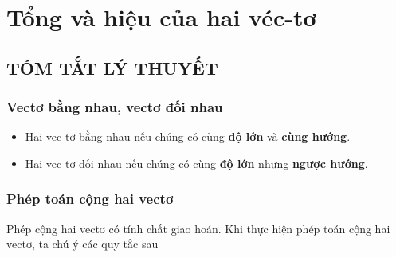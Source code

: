 \section{Tổng và hiệu của hai véc-tơ}

\subsection{TÓM TẮT LÝ THUYẾT}
\subsubsection{Vectơ bằng nhau, vectơ đối nhau}
	\begin{itemize}
		\item  Hai vec tơ bằng nhau nếu chúng có cùng \textbf{độ lớn} và \textbf{cùng hướng}.
		\item  Hai vec tơ đối nhau nếu chúng có cùng \textbf{độ lớn} nhưng \textbf{ngược hướng}.
	\end{itemize}
\subsubsection{Phép toán cộng hai vectơ}
Phép cộng hai vectơ có tính chất giao hoán. Khi thực hiện phép toán cộng hai vectơ, ta chú ý các quy tắc sau


